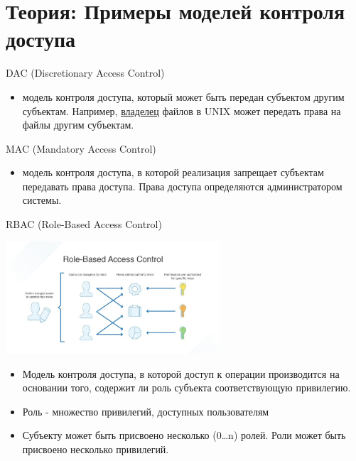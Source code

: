 \documentclass[presentation]{beamer}
\begin{document}
\section{Теория: Примеры моделей контроля доступа}
\label{sec:org6301f42}
\begin{frame}[label={sec:org71be13d}]{DAC (Discretionary Access Control)}
\begin{itemize}
\item модель контроля доступа, который может быть передан субъектом другим субъектам. Например, \uline{владелец} файлов в UNIX может передать права на файлы другим субъектам.
\end{itemize}
\end{frame}

\begin{frame}[label={sec:org50bb317}]{MAC (Mandatory Access Control)}
\begin{itemize}
\item модель контроля доступа, в которой реализация запрещает субъектам передавать права доступа. Права доступа определяются администратором системы.
\end{itemize}
\end{frame}



\begin{frame}[label={sec:org2867552}]{RBAC (Role-Based Access Control)}
\begin{center}
\includegraphics[width=0.6\textwidth]{./img/rbac.jpg}
\end{center}

\begin{itemize}
\item Модель контроля доступа, в которой доступ к операции  производится на основании того, содержит ли роль субъекта соответствующую привилегию.

\item Роль - множество привилегий, доступных пользователям

\item Субъекту может быть присвоено несколько (0\ldots{}n) ролей. Роли может быть присвоено несколько привилегий.
\end{itemize}
\end{frame}
\end{document}
